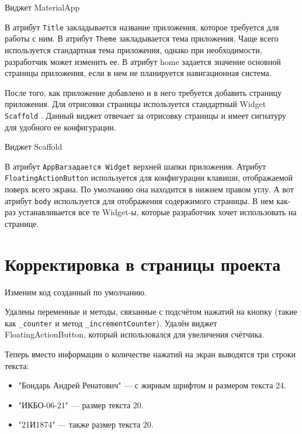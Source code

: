 \begin{image}
	\caption{Виджет MaterialApp}
	\label{fig:widget:materialapp}
\end{image}

В атрибут \texttt{Title} закладывается название приложения,
которое требуется для работы с ним.
В атрибут \texttt{Theme} закладывается тема приложения.
Чаще всего используется стандартная тема приложения,
однако при необходимости, разработчик может изменить ее.
В атрибут home задается значение основной страницы приложения,
если в нем не планируется навигационная система.\par
После того, как приложение добавлено
и в него требуется добавить страницу приложения.
Для отрисовки страницы используется
стандартный Widget \texttt{Scaffold} .
Данный виджет отвечает за отрисовку страницы и имеет сигнатуру
для удобного ее конфигурации.

\begin{image}
	\caption{Виджет Scaffold}
	\label{fig:widget:scaffold}
\end{image}

В атрибут \texttt{AppBarзадается Widget} верхней шапки приложения.
Атрибут \texttt{FloatingActionButton} используется для конфигурации клавиши,
отображаемой поверх всего экрана.
По умолчанию она находится в нижнем правом углу.
А вот атрибут \texttt{body} используется для отображения содержимого страницы.
В нем как-раз устанавливается все те Widget-ы,
которые разработчик хочет использовать на странице.

\section{Корректировка в страницы проекта}

Изменим код созданный по умолчанию.\par
Удалены переменные и методы,
связанные с подсчётом нажатий на кнопку
(такие как \texttt{\_counter} и метод \texttt{\_incrementCounter}).
Удалён виджет FloatingActionButton, который использовался
для увеличения счётчика.\par
Теперь вместо информации о количестве нажатий на экран выводятся
три строки текста:

\begin{itemize}
	\item "Бондарь Андрей Ренатович" --- с жирным шрифтом и размером текста 24.
	\item "ИКБО-06-21" --- размер текста 20.
	\item "21И1874" --- также размер текста 20.
\end{itemize}

